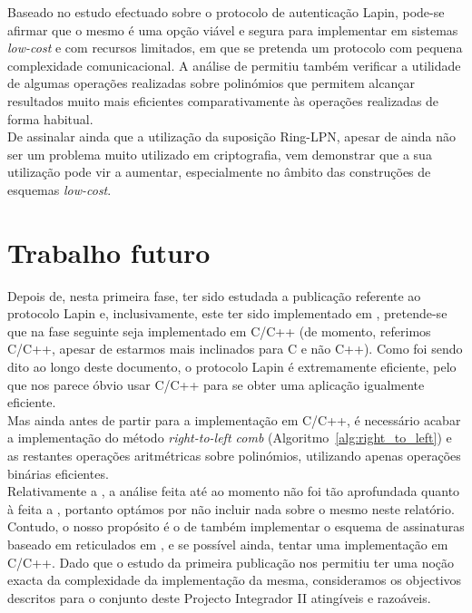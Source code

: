 Baseado no estudo efectuado sobre o protocolo de autenticação Lapin, pode-se afirmar que o mesmo é uma opção viável e segura para implementar em sistemas \textit{low-cost} e com recursos limitados, em que se pretenda um protocolo com pequena complexidade comunicacional. A análise de \cite{lapin} permitiu também verificar a utilidade de algumas operações realizadas sobre polinómios que permitem alcançar resultados muito mais eficientes comparativamente às operações realizadas de forma habitual.\\
De assinalar ainda que a utilização da suposição \textsf{Ring-LPN}, apesar de ainda não ser um problema muito utilizado em criptografia, vem demonstrar que a sua utilização pode vir a aumentar, especialmente no âmbito das construções de esquemas \textit{low-cost}.\\ 
\section{Trabalho futuro}
Depois de, nesta primeira fase, ter sido estudada a publicação referente ao protocolo Lapin e, inclusivamente, este ter sido implementado em \sage, pretende-se que na fase seguinte seja implementado em \textsf{C/C++} (de momento, referimos \textsf{C/C++}, apesar de estarmos mais inclinados para \textsf{C} e não \textsf{C++}). Como foi sendo dito ao longo deste documento, o protocolo Lapin é extremamente eficiente, pelo que nos parece óbvio usar \textsf{C/C++} para se obter uma aplicação igualmente eficiente.\\
Mas ainda antes de partir para a implementação em \textsf{C/C++}, é necessário acabar a implementação do método \textit{right-to-left comb} (Algoritmo~\ref{alg:right_to_left}) e as restantes operações aritmétricas sobre polinómios, utilizando apenas operações binárias eficientes.\\
Relativamente a \cite{lattice_sig}, a análise feita até ao momento não foi tão aprofundada quanto à feita a \cite{lapin}, portanto optámos por não incluir nada sobre o mesmo neste relatório. Contudo, o nosso propósito é o de também implementar o esquema de assinaturas baseado em reticulados em \sage, e se possível ainda, tentar uma implementação em \textsf{C/C++}. Dado que o estudo da primeira publicação nos permitiu ter uma noção exacta da complexidade da implementação da mesma, consideramos os objectivos descritos para o conjunto deste Projecto Integrador II atingíveis e razoáveis.